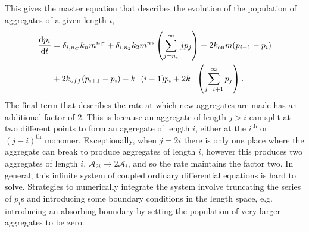 This gives the master equation that describes the evolution of the population of aggregates of a given length $i$, 
\begin{equation}
\begin{split}
    \frac{\text{d}p_i}{\text{d}t} &= \delta_{i, n_C}k_n m^{n_C} + \delta_{i, n_2} k_2 m^{n_2} \left(\sum_{j=n_{\mathrm{c}}}^{\infty} j p_j\right) + 2k_\text{on} m (p_{i-1}-p_i) \\
    & + 2k_{off} (p_{i+1}-p_i) - k_{-}(i-1)p_i + 2k_{-}\left(\sum_{j=i+1}^{\infty}p_j\right).
    \end{split}
    \label{eq:4-pi_evolution}
\end{equation}
The final term that describes the rate at which new aggregates are made has an additional factor of $2$. This is because an aggregate of length $j>i$ can split at two different points to form an aggregate of length $i$, either at the $i^{\text{th}}$ or $(j-i)^{\text{th}}$ monomer. Exceptionally, when $j=2i$ there is only one place where the aggregate can break to produce aggregates of length $i$, however this produces two aggregates of length $i$, $\mathcal{A}_{2i}\rightarrow2\mathcal{A}_i$, and so the rate maintains the factor two. In general, this infinite system of coupled ordinary differential equations is hard to solve. Strategies to numerically integrate the system involve truncating the series of $p_i$s and introducing some boundary conditions in the length space, e.g. introducing an absorbing boundary by setting the population of very larger aggregates to be zero.

